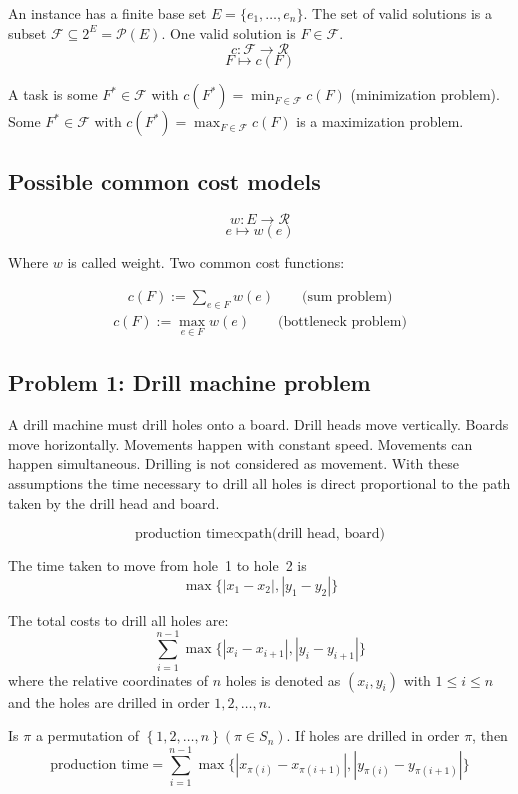 \documentclass[a4paper]{article}
\theoremstyle{definition}
\newcommand{\set}[1]{\left\{#1\right\}}
\begin{document}
An instance has a finite base set $E = \{e_1, \ldots, e_n\}$.
The set of valid solutions is a subset $\mathcal{F} \subseteq 2^E = \mathcal{P}(E)$.
One valid solution is $F \in \mathcal{F}$.
\[
    c : \mathcal{F} \rightarrow \mathcal{R}
\] \[
    F \mapsto c(F)
\]

A task is some $F^* \in \mathcal{F}$ with $c(F^*) = \min_{F \in \mathcal{F}} c(F)$
(minimization problem). Some $F^* \in \mathcal{F}$ with $c(F^*) = \max_{F \in \mathcal{F}} c(F)$
is a maximization problem.

\subsection{Possible common cost models}
%
\[
    w: E \rightarrow \mathcal{R}
\] \[
    e \mapsto w(e)
\]

Where $w$ is called weight. Two common cost functions:

\begin{align}
    c(F) := \sum_{e \in F} w(e)  \qquad \text{(sum problem)}
\end{align}
\begin{align}
    c(F) := \max_{e \in F} w(e)  \qquad \text{(bottleneck problem)}
\end{align}

\subsection{Problem 1: Drill machine problem}
%
A drill machine must drill holes onto a board. Drill heads move vertically. Boards move horizontally. Movements happen with constant speed. Movements can happen simultaneous. Drilling is not considered as movement. With these assumptions the time necessary to drill all holes is direct proportional to the path taken by the drill head and board.

\[
    \text{production time} \propto \text{path(drill head, board)}
\]

The time taken to move from hole~1 to hole~2 is
\[
    \max\{|x_1 - x_2|, |y_1 - y_2|\}
\]

The total costs to drill all holes are:
\[
    \sum_{i=1}^{n-1} \max\{|x_i - x_{i+1}|, |y_i - y_{i+1}|\}
\]
where the relative coordinates of $n$ holes is denoted as $(x_i, y_i)$ with $1 \leq i \leq n$ and the holes are drilled in order $1, 2, \ldots, n$.

Is $\pi$ a permutation of $\set{1, 2, \ldots, n} (\pi \in S_n)$. If holes are drilled in order $\pi$, then
\[
    \text{production time} = \sum_{i=1}^{n-1} \max\{|x_{\pi(i)} - x_{\pi(i+1)}|, |y_{\pi(i)} - y_{\pi(i+1)}|\}
\]
\end{document}
